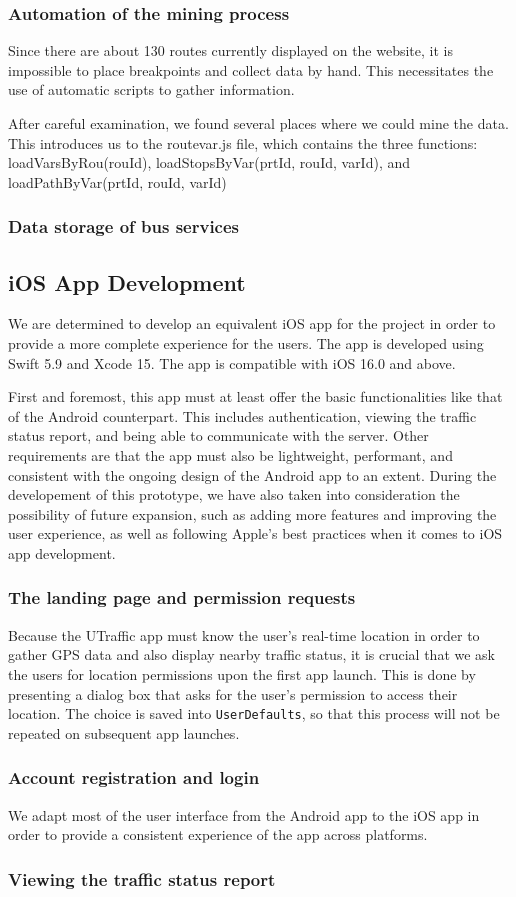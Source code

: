 \subsubsection{Automation of the mining process}

Since there are about 130 routes currently displayed on the website, it is impossible to place breakpoints and collect data by hand. This necessitates the use of automatic scripts to gather information.

After careful examination, we found several places where we could mine the data. This introduces us to the routevar.js file, which contains the three functions: loadVarsByRou(rouId), loadStopsByVar(prtId, rouId, varId), and loadPathByVar(prtId, rouId, varId)

\subsubsection{Data storage of bus services}

\subsection{iOS App Development}
We are determined to develop an equivalent iOS app for the project in order to provide a more complete experience for the users. The app is developed using Swift 5.9 and Xcode 15. The app is compatible with iOS 16.0 and above.

First and foremost, this app must at least offer the basic functionalities like that of the Android counterpart. This includes authentication, viewing the traffic status report, and being able to communicate with the server. Other requirements are that the app must also be lightweight, performant, and consistent with the ongoing design of the Android app to an extent. During the developement of this prototype, we have also taken into consideration the possibility of future expansion, such as adding more features and improving the user experience, as well as following Apple's best practices when it comes to iOS app development.

\subsubsection{The landing page and permission requests}
Because the UTraffic app must know the user's real-time location in order to gather GPS data and also display nearby traffic status, it is crucial that we ask the users for location permissions upon the first app launch. This is done by presenting a dialog box that asks for the user's permission to access their location. The choice is saved into \lstinline{UserDefaults}, so that this process will not be repeated on subsequent app launches.

\subsubsection{Account registration and login}
We adapt most of the user interface from the Android app to the iOS app in order to provide a consistent experience of the app across platforms. 

\subsubsection{Viewing the traffic status report}


